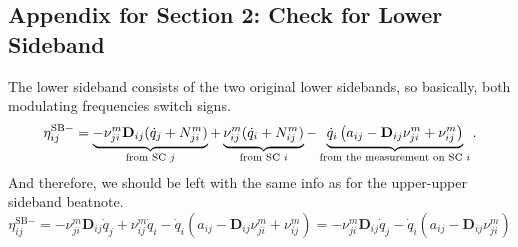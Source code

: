 \documentclass[11pt]{article}
\begin{document}
\subsection{Appendix for Section 2: Check for Lower Sideband}
The lower sideband consists of the two original lower sidebands, so basically, both modulating frequencies switch signs.
\begin{equation*}
\eta^{\text{SB}-}_{ij} =
\underbrace{%
    -\nu_{j i}^{m} \mathbf{D}_{ij} (\dot{q}_j + N_{j i}^{m})
}_{\text{from SC $j$}}
+
\underbrace{%
    \nu_{i j}^{m} (\dot{q}_i + N_{i j}^{m})
}_{\text{from SC $i$}}
-
\underbrace{%
    \dot{q}_i \left( a_{ij} - \mathbf{D}_{ij} \nu_{j i}^{m} + \nu_{i j}^{m} \right)
}_{\text{from the measurement on SC $i$}}.
\end{equation*}
And therefore, we should be left with the same info as for the upper-upper sideband beatnote.
\begin{equation*}
    \eta^{\text{SB}-}_{ij}=-\nu_{j i}^{m} \mathbf{D}_{ij} \dot{q}_j
+\nu_{i j}^{m} \dot{q}_i -\dot{q}_i \left( a_{ij}- \mathbf{D}_{ij} \nu_{j i}^{m} + \nu_{i j}^{m} \right)=-\nu_{j i}^{m} \mathbf{D}_{ij} \dot{q}_j -\dot{q}_i \left( a_{ij} - \mathbf{D}_{ij} \nu_{j i}^{m} \right)
\end{equation*}
\end{document}
